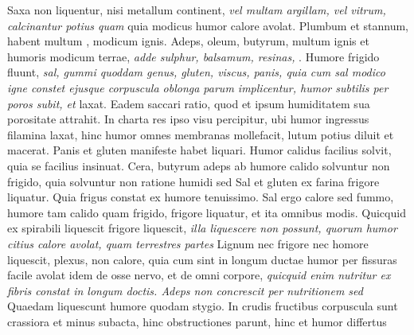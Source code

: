 \textit{} Saxa non liquentur, nisi metallum continent,
\textit{vel multam argillam\protect{}, vel vitrum, calcinantur potius quam } quia modicus humor calore avolat. Plumbum et stannum, habent multum , modicum ignis. Adeps\protect{}, oleum\protect{}, butyrum\protect{}, multum ignis et humoris modicum terrae, \textit{adde sulphur, balsamum\protect{}, resinas\protect{}, }. Humore frigido fluunt, \textit{sal\protect{}, gummi quoddam genus, gluten\protect{}, viscus\protect{}, panis\protect{}, quia cum sal modico igne constet ejusque corpuscula oblonga parum implicentur, humor subtilis per poros subit, et } laxat. Eadem saccari ratio, quod et ipsum humiditatem sua porositate attrahit. In charta res ipso visu percipitur, ubi humor ingressus filamina laxat, hinc humor omnes membranas\protect{} mollefacit, lutum potius diluit et macerat. Panis et gluten manifeste habet  liquari. Humor calidus facilius solvit, quia se facilius insinuat. Cera, butyrum adeps ab humore calido solvuntur non frigido, quia solvuntur non ratione humidi sed  Sal et gluten ex farina frigore liquatur. Quia frigus constat ex humore tenuissimo. Sal ergo calore sed fummo, humore tam calido quam frigido, frigore liquatur, et ita omnibus modis. Quicquid ex spirabili liquescit frigore liquescit, \textit{illa liquescere non possunt, quorum humor citius calore avolat, quam terrestres partes } Lignum nec frigore nec homore liquescit,  plexus, non calore, quia cum  sint in longum ductae humor per fissuras\protect{} facile avolat idem de osse nervo, et de omni corpore, \textit{quicquid enim nutritur ex fibris constat in longum doctis. Adeps non concrescit per nutritionem sed } Quaedam liquescunt humore quodam stygio. In crudis fructibus corpuscula sunt crassiora et minus subacta, hinc obstructiones parunt, hinc et humor differtus 